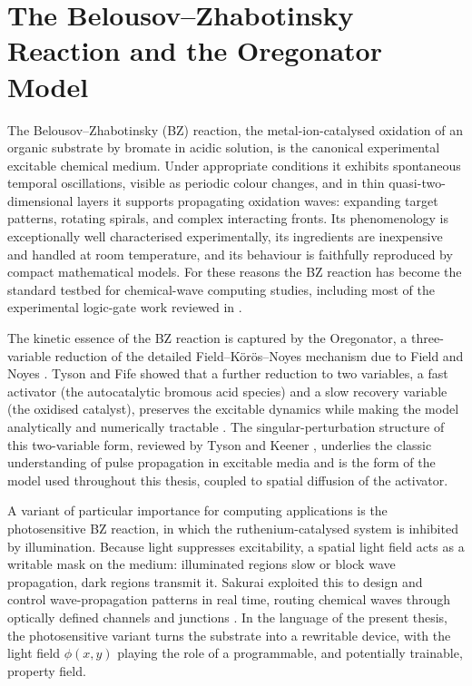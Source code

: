 \section{The Belousov--Zhabotinsky Reaction and the Oregonator Model}
\label{sec:lit_bz}

The Belousov--Zhabotinsky (BZ) reaction, the metal-ion-catalysed oxidation of an organic substrate by bromate in acidic solution, is the canonical experimental excitable chemical medium. Under appropriate conditions it exhibits spontaneous temporal oscillations, visible as periodic colour changes, and in thin quasi-two-dimensional layers it supports propagating oxidation waves: expanding target patterns, rotating spirals, and complex interacting fronts. Its phenomenology is exceptionally well characterised experimentally, its ingredients are inexpensive and handled at room temperature, and its behaviour is faithfully reproduced by compact mathematical models. For these reasons the BZ reaction has become the standard testbed for chemical-wave computing studies, including most of the experimental logic-gate work reviewed in .

The kinetic essence of the BZ reaction is captured by the Oregonator, a three-variable reduction of the detailed Field--K\"or\"os--Noyes mechanism due to Field and Noyes \cite{field1974oregonator}. Tyson and Fife showed that a further reduction to two variables, a fast activator (the autocatalytic bromous acid species) and a slow recovery variable (the oxidised catalyst), preserves the excitable dynamics while making the model analytically and numerically tractable \cite{tyson1980target}. The singular-perturbation structure of this two-variable form, reviewed by Tyson and Keener \cite{tyson1988singular}, underlies the classic understanding of pulse propagation in excitable media and is the form of the model used throughout this thesis, coupled to spatial diffusion of the activator.

A variant of particular importance for computing applications is the photosensitive BZ reaction, in which the ruthenium-catalysed system is inhibited by illumination. Because light suppresses excitability, a spatial light field acts as a writable mask on the medium: illuminated regions slow or block wave propagation, dark regions transmit it. Sakurai \etal exploited this to design and control wave-propagation patterns in real time, routing chemical waves through optically defined channels and junctions \cite{sakurai2002design}. In the language of the present thesis, the photosensitive variant turns the substrate into a rewritable device, with the light field $\phi(x,y)$ playing the role of a programmable, and potentially trainable, property field.

